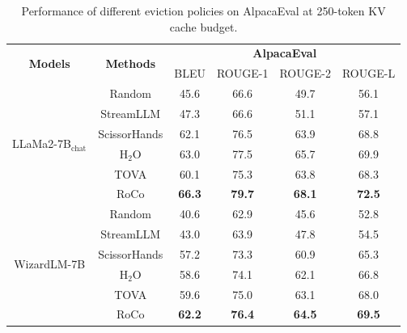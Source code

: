 \begin{table}[t]
    \centering
    \small
    \begin{tabular}{cc|cccc}
    \toprule
    \multicolumn{1}{c}{\multirow{2}{*}{\textbf{Models}}} & \multirow{2}{*}{\textbf{Methods}} & \multicolumn{4}{c}{\textbf{AlpacaEval}}               \\
    \multicolumn{1}{c}{} &              & BLEU & ROUGE-1  & ROUGE-2  & ROUGE-L  \\
    \midrule
    \multirow{6}{*}{LLaMa2-7B$_{\text{chat}}$}             & Random                   &45.6  &66.6  &49.7  &56.1     \\
                         & StreamLLM   &47.3  &66.6    &51.1  &57.1    \\
                         & ScissorHands &62.1  &76.5    &63.9  &68.8     \\
                         & H$_{\text{2}}$O          &63.0  &77.5   &65.7  &69.9      \\
                         & TOVA         &60.1 &75.3    &63.8  &68.3    \\
                         & RoCo         &\textbf{66.3}  &\textbf{79.7}    &\textbf{68.1}  &\textbf{72.5}     \\
    \midrule
    \multirow{6}{*}{WizardLM-7B}             & Random                   &40.6  &62.9  &45.6  &52.8     \\
                         & StreamLLM   &43.0  &63.9    &47.8  &54.5     \\
                         & ScissorHands &57.2  &73.3    &60.9  &65.3     \\
                         & H$_{\text{2}}$O          &58.6  &74.1    &62.1  &66.8     \\
                         & TOVA         &59.6  &75.0    &63.1  &68.0     \\
                         & RoCo         &\textbf{62.2}  &\textbf{76.4}    &\textbf{64.5}  &\textbf{69.5}    \\
    \bottomrule
    \end{tabular}
    \caption{Performance of different eviction policies on AlpacaEval at 250-token KV cache budget.}
    \label{table:alpacaeval}
\end{table}
